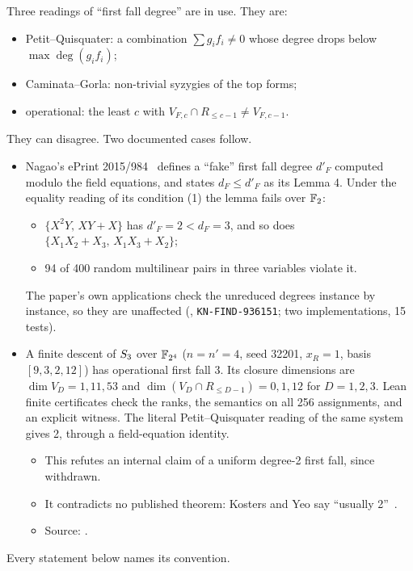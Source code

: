 \begin{remark}\label{rem:defs}
Three readings of ``first fall degree'' are in use. They are:
\begin{itemize}
\item Petit--Quisquater: a combination $\sum g_if_i\ne0$ whose degree
  drops below $\max\deg(g_if_i)$;
\item Caminata--Gorla: non-trivial syzygies of the top forms;
\item operational: the least $c$ with
  $V_{F,c}\cap R_{\le c-1}\ne V_{F,c-1}$.
\end{itemize}
They can disagree. Two documented cases follow.
\begin{itemize}
\item Nagao's ePrint 2015/984~\cite{nagao2015} defines a ``fake'' first
  fall degree $d'_F$ computed modulo the field equations, and states
  $d_F\le d'_F$ as its Lemma 4. Under the equality reading of its
  condition (1) the lemma fails over $\mathbb{F}_2$:
  \begin{itemize}
  \item $\{X^2Y,\,XY+X\}$ has $d'_F=2<d_F=3$, and so does
    $\{X_1X_2+X_3,\,X_1X_3+X_2\}$;
  \item 94 of 400 random multilinear pairs in three variables violate it.
  \end{itemize}
  The paper's own applications check the unreduced degrees instance by
  instance, so they are unaffected
  (,
  \texttt{KN-FIND-936151}; two implementations, 15 tests).
\item A finite descent of $S_{3}$ over $\mathbb{F}_{2^4}$ ($n=n'=4$, seed 32201,
  $x_R=1$, basis $[9,3,2,12]$) has operational first fall 3. Its closure
  dimensions are $\dim V_D=1,11,53$ and
  $\dim(V_D\cap R_{\le D-1})=0,1,12$ for $D=1,2,3$. Lean finite
  certificates check the ranks, the semantics on all 256 assignments, and
  an explicit witness. The literal Petit--Quisquater reading of the same
  system gives 2, through a field-equation identity.
  \begin{itemize}
  \item This refutes an internal claim of a uniform degree-2 first fall,
    since withdrawn.
  \item It contradicts no published theorem: Kosters and Yeo say ``usually
    2''~\cite{kosters2015notes}.
  \item Source: .
  \end{itemize}
\end{itemize}
Every statement below names its convention.
\end{remark}

